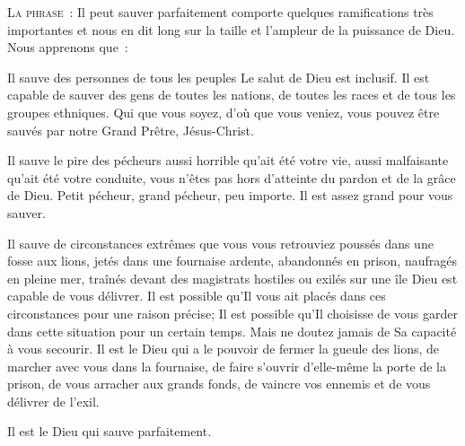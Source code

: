 \lettrine{L}{a phrase~:} 
 \og Il peut sauver parfaitement \fg{} comporte quelques ramifications
 très importantes et nous en dit long sur la taille et l'ampleur
 de la puissance de Dieu. Nous apprenons que~: 

Il sauve des personnes de tous les peuples
 \ocadr Le salut de Dieu est inclusif.
 Il est capable de sauver des gens de toutes les nations,
 de toutes les races et de tous les groupes ethniques.
 Qui que vous soyez, d'où que vous veniez,
 vous pouvez être sauvés par notre Grand Prêtre, Jésus-Christ. 


Il sauve le pire des pécheurs \ocadr aussi horrible qu'ait été votre vie,
 aussi malfaisante qu'ait été votre conduite, vous n'êtes pas
 hors d'atteinte du pardon et de la grâce de Dieu.
 Petit pécheur, grand pécheur, peu importe.
 Il est assez grand pour vous sauver. 

Il sauve de circonstances extrêmes \ocadr que vous vous retrouviez poussés
 dans une fosse aux lions, jetés dans une fournaise ardente,
 abandonnés en prison, naufragés en pleine mer,
 traînés devant des magistrats hostiles ou exilés sur une île
 \ocadr Dieu est capable de vous délivrer.
 Il est possible qu'Il vous ait placés dans ces circonstances
 pour une raison précise; Il est possible qu'Il choisisse de vous garder
 dans cette situation pour un certain temps.
 Mais ne doutez jamais de Sa capacité à vous secourir.
 Il est le Dieu qui a le pouvoir de fermer la gueule des lions,
 de marcher avec vous dans la fournaise, de faire s'ouvrir d'elle-même
 la porte de la prison, de vous arracher aux grands fonds,
 de vaincre vos ennemis et de vous délivrer de l'exil. 

Il est le Dieu qui sauve parfaitement. 

\dvrule






